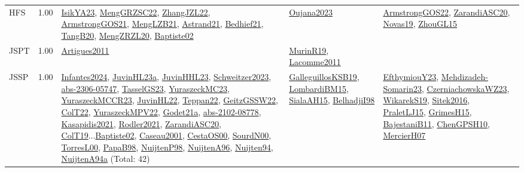 {\begin{longtable}{p{3cm}r>{\raggedright\arraybackslash}p{6cm}>{\raggedright\arraybackslash}p{6cm}>{\raggedright\arraybackslash}p{8cm}}
\index{HFS}\index{Classification!HFS}HFS &  1.00 & \hyperref[detail:IsikYA23]{IsikYA23}, \hyperref[detail:MengGRZSC22]{MengGRZSC22}, \hyperref[detail:ZhangJZL22]{ZhangJZL22}, \hyperref[detail:ArmstrongGOS21]{ArmstrongGOS21}, \hyperref[detail:MengLZB21]{MengLZB21}, \hyperref[detail:Astrand21]{Astrand21}, \hyperref[detail:Bedhief21]{Bedhief21}, \hyperref[detail:TangB20]{TangB20}, \hyperref[detail:MengZRZL20]{MengZRZL20}, \hyperref[detail:Baptiste02]{Baptiste02} & \hyperref[detail:Oujana2023]{Oujana2023} & \hyperref[detail:ArmstrongGOS22]{ArmstrongGOS22}, \hyperref[detail:ZarandiASC20]{ZarandiASC20}, \hyperref[detail:Novas19]{Novas19}, \hyperref[detail:ZhouGL15]{ZhouGL15}\\
\index{JSPT}\index{Classification!JSPT}JSPT &  1.00 & \hyperref[detail:Artigues2011]{Artigues2011} & \hyperref[detail:MurinR19]{MurinR19}, \hyperref[detail:Lacomme2011]{Lacomme2011} & \\
\index{JSSP}\index{Classification!JSSP}JSSP &  1.00 & \hyperref[detail:Infantes2024]{Infantes2024}, \hyperref[detail:JuvinHL23a]{JuvinHL23a}, \hyperref[detail:JuvinHHL23]{JuvinHHL23}, \hyperref[detail:Schweitzer2023]{Schweitzer2023}, \hyperref[detail:abs-2306-05747]{abs-2306-05747}, \hyperref[detail:TasselGS23]{TasselGS23}, \hyperref[detail:YuraszeckMC23]{YuraszeckMC23}, \hyperref[detail:YuraszeckMCCR23]{YuraszeckMCCR23}, \hyperref[detail:JuvinHL22]{JuvinHL22}, \hyperref[detail:Teppan22]{Teppan22}, \hyperref[detail:GeitzGSSW22]{GeitzGSSW22}, \hyperref[detail:ColT22]{ColT22}, \hyperref[detail:YuraszeckMPV22]{YuraszeckMPV22}, \hyperref[detail:Godet21a]{Godet21a}, \hyperref[detail:abs-2102-08778]{abs-2102-08778}, \hyperref[detail:Kasapidis2021]{Kasapidis2021}, \hyperref[detail:Rodler2021]{Rodler2021}, \hyperref[detail:ZarandiASC20]{ZarandiASC20}, \hyperref[detail:ColT19]{ColT19}...\hyperref[detail:Baptiste02]{Baptiste02}, \hyperref[detail:Caseau2001]{Caseau2001}, \hyperref[detail:CestaOS00]{CestaOS00}, \hyperref[detail:SourdN00]{SourdN00}, \hyperref[detail:TorresL00]{TorresL00}, \hyperref[detail:PapaB98]{PapaB98}, \hyperref[detail:NuijtenP98]{NuijtenP98}, \hyperref[detail:NuijtenA96]{NuijtenA96}, \hyperref[detail:Nuijten94]{Nuijten94}, \hyperref[detail:NuijtenA94a]{NuijtenA94a} (Total: 42) & \hyperref[detail:GalleguillosKSB19]{GalleguillosKSB19}, \hyperref[detail:LombardiBM15]{LombardiBM15}, \hyperref[detail:SialaAH15]{SialaAH15}, \hyperref[detail:BelhadjiI98]{BelhadjiI98} & \hyperref[detail:EfthymiouY23]{EfthymiouY23}, \hyperref[detail:Mehdizadeh-Somarin23]{Mehdizadeh-Somarin23}, \hyperref[detail:CzerniachowskaWZ23]{CzerniachowskaWZ23}, \hyperref[detail:WikarekS19]{WikarekS19}, \hyperref[detail:Sitek2016]{Sitek2016}, \hyperref[detail:PraletLJ15]{PraletLJ15}, \hyperref[detail:GrimesH15]{GrimesH15}, \hyperref[detail:BajestaniB11]{BajestaniB11}, \hyperref[detail:ChenGPSH10]{ChenGPSH10}, \hyperref[detail:MercierH07]{MercierH07}\\

\end{longtable}}

